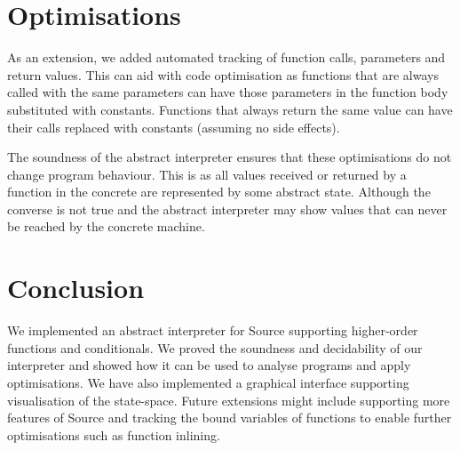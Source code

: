 \documentclass[12pt]{article}
\begin{document}
\section{Optimisations}
As an extension, we added automated tracking of function calls, parameters and return values. This can aid with code optimisation as functions that are always called with the same parameters can have those parameters in the function body substituted with constants. Functions that always return the same value can have their calls replaced with constants (assuming no side effects). 

\begin{center}
\end{center}

The soundness of the abstract interpreter ensures that these optimisations do not change program behaviour. This is as all values received or returned by a function in the concrete are represented by some abstract state. Although the converse is not true and the abstract interpreter may show values that can never be reached by the concrete machine.

\section{Conclusion}
We implemented an abstract interpreter for Source supporting higher-order functions and conditionals. We proved the soundness and decidability of our interpreter and showed how it can be used to analyse programs and apply optimisations. We have also implemented a graphical interface supporting visualisation of the state-space. Future extensions might include supporting more features of Source and tracking the bound variables of functions to enable further optimisations such as function inlining. 



\end{document}
